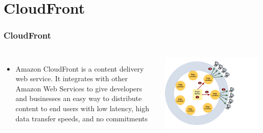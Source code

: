 \documentclass{beamer}
\begin{document}
\section{CloudFront}
\begin{frame}[fragile]
\frametitle{CloudFront}
\begin{columns}
\begin{itemize}
\item Amazon CloudFront is a content delivery web service. It integrates with other Amazon Web Services to give developers and businesses an easy way to distribute content to end users with low latency, high data transfer speeds, and no commitments
\end{itemize}
\includegraphics[width= 1.0 \textwidth]{cloudfront.eps}
\end{columns}
\end{frame}
\end{document}
